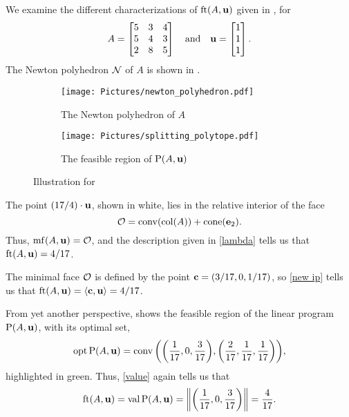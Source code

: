 \documentclass[11pt]{amsart}
\begin{document}
\begin{example}\label{ex: ft}
   We examine the different characterizations of $\operatorname{ft}(A, \mathbf{u})$ given in , for 
   \[A=\begin{bmatrix}5&3&4\\ 5&4&3\\ 2&8&5\end{bmatrix} \quad \text{and} \quad \mathbf{u} =
      \begin{bmatrix} 1 \\ 1\\ 1 \end{bmatrix}.\]
   The Newton polyhedron $\mathcal{N}$ of $A$ is shown in .
   \begin{figure}
   \centering
   \begin{subfigure}{.48\textwidth}
      \centering
      \texttt{[image: Pictures/newton\_polyhedron.pdf]}\\[1.4mm]
      \caption{The Newton polyhedron of $A$}
      \label{fig: newton polyhedron}
   \end{subfigure}
   \begin{subfigure}{.48\textwidth}
      \centering
      \texttt{[image: Pictures/splitting\_polytope.pdf]}
      \caption{The feasible region of $\mathrm{P}(A,\mathbf{u})$}
      \label{fig: splitting polytope}
   \end{subfigure}
      \caption{Illustration for }
   \label{fig: newton polyhedron and splitting polytope}
   \end{figure}
   The point $(17/4)\cdot \mathbf{u}$, shown in white, lies in the relative interior of the face
   \[\mathcal{O} = \operatorname{conv}(\operatorname{col}(A)) + \operatorname{cone}(\mathbf{e}_2).\]
   Thus, $\operatorname{mf}(A,\mathbf{u}) = \mathcal{O}$, and the description given in \eqref{lambda} tells us that $\operatorname{ft}(A, \mathbf{u}) = 4/17$.

   The minimal face $\mathcal{O}$ is defined by the point $\mathbf{c} = (3/17, 0, 1/17)$, so \eqref{new ip} tells us that
   $\operatorname{ft}(A, \mathbf{u}) = \langle \mathbf{c}, \mathbf{u} \rangle = 4/17$.

   From yet another perspective,  shows the feasible region of the linear program $\mathrm{P}(A,\mathbf{u})$, with its optimal set,
   \[\operatorname{opt} \mathrm{P}(A,\mathbf{u}) = \operatorname{conv}\bigg(\bigg(\frac1{17}, 0, \frac3{17}\bigg),\bigg(\frac2{17}, \frac1{17}, \frac1{17}\bigg)\bigg),\]
   highlighted in green.
   Thus, \eqref{value} again tells us that
   \[\operatorname{ft}(A, \mathbf{u}) = \operatorname{val} \mathrm{P}(A,\mathbf{u}) = \bigg\|\bigg(\frac1{17}, 0, \frac3{17}\bigg)\bigg\| = \frac4{17}.\]
\end{example}
\end{document}
